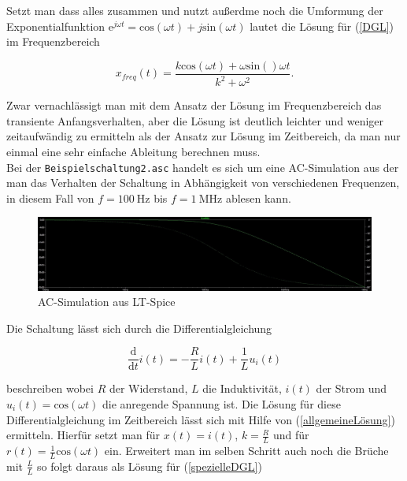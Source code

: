 Setzt man dass alles zusammen und nutzt außerdme noch die Umformung der Exponentialfunktion $\mathrm{e}^{j\omega t} = \mathrm{cos}(\omega t) + j\mathrm{sin}(\omega t)$ lautet die Lösung für (\ref{DGL}) im Frequenzbereich

\begin{equation}
	x_{freq} (t) = \frac{k\mathrm{cos}(\omega t) + \omega\mathrm{sin}()\omega t}{k^2+ \omega^2}.
	\label{lsgfreq}
\end{equation}

Zwar vernachlässigt man mit dem Ansatz der Lösung im Frequenzbereich das transiente Anfangsverhalten, aber die Lösung ist deutlich leichter und weniger zeitaufwändig zu ermitteln als der Ansatz zur Lösung im Zeitbereich, da man nur einmal eine sehr einfache Ableitung berechnen muss.\\


Bei der \texttt{Beispielschaltung2.asc} handelt es sich um eine AC-Simulation aus der man das Verhalten der Schaltung in Abhängigkeit von verschiedenen Frequenzen, in diesem Fall von $f=\SI{100}{\hertz}$ bis $f=\SI{1}{\mega\hertz}$ ablesen kann. 

\begin{figure}[h]
	\includegraphics[width=\textwidth]{data/spiceplot32}
	\caption{AC-Simulation aus LT-Spice}
	\label{spiceplot}
\end{figure}

Die Schaltung lässt sich durch die Differentialgleichung

\begin{equation*}
	\frac{\mathrm{d}}{\mathrm{d}t}i(t) = -\frac{R}{L}i(t) +\frac{1}{L}u_i(t)
	\label{spezielleDGL}
\end{equation*}

beschreiben wobei $R$ der Widerstand, $L$ die Induktivität, $i(t)$ der Strom und $u_i(t)=\mathrm{cos}(\omega t)$ die anregende Spannung ist. Die Lösung für diese Differentialgleichung im Zeitbereich lässt sich mit Hilfe von (\ref{allgemeineLösung}) ermitteln. Hierfür setzt man für $x(t) = i(t)$, $k=\frac{R}{L}$ und für $r(t) = \frac{1}{L}\mathrm{cos}(\omega t)$ ein. Erweitert man im selben Schritt auch noch die Brüche mit $\frac{L}{L}$ so folgt daraus als Lösung für (\ref{spezielleDGL})

